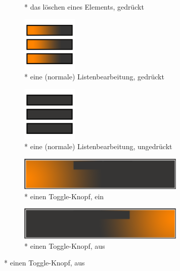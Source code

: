 \documentclass[FIPLY_base.tex]{subfiles}
\begin{document}
\begin{figure}[H]
\begin{subfigure}[b]{0.2\textwidth}
			\caption{* das löschen eines Elements, gedrückt}
		\end{subfigure}
		\hfil
		\begin{subfigure}[b]{0.2\textwidth}
			\includegraphics[scale=0.5]{img/icons/simplelistviewpressed}
			\caption{* eine (normale) Listenbearbeitung, gedrückt}
		\end{subfigure}
		\hfil
		\begin{subfigure}[b]{0.2\textwidth}
			\includegraphics[scale=0.5]{img/icons/simplelistviewunpressed}
			\caption{* eine (normale) Listenbearbeitung, ungedrückt}
		\end{subfigure}
		\hfil
		\begin{subfigure}[b]{0.2\textwidth}
			\includegraphics[scale=0.8]{img/icons/toggleoffsmall}
			\caption{* einen Toggle-Knopf, ein}
		\end{subfigure}
		\hfil
		\begin{subfigure}[b]{0.2\textwidth}
			\includegraphics[scale=0.8]{img/icons/toggleonsmall}
			\caption{* einen Toggle-Knopf, aus}
		\end{subfigure}
		\hfil

	\end{figure}
	
	
\end{document}
